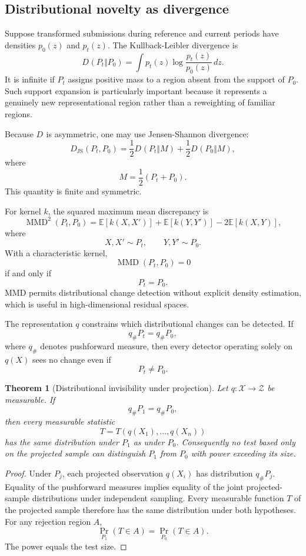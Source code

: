 \documentclass[11pt]{article}
\newtheorem{theorem}[definition]{Theorem}
\theoremstyle{definition}
\DeclareMathOperator{\KL}{D_{\mathrm{KL}}}
\DeclareMathOperator{\Prob}{Pr}
\newcommand{\E}{\mathbb{E}}
\begin{document}
\subsection{Distributional novelty as divergence}

Suppose transformed submissions during reference and current periods have densities \(p_0(z)\) and \(p_t(z)\). The Kullback-Leibler divergence is
\[
D_{\KL}(P_t\Vert P_0)
=
\int
p_t(z)
\log
\frac{p_t(z)}{p_0(z)}
\,dz.
\]
It is infinite if \(P_t\) assigns positive mass to a region absent from the support of \(P_0\). Such support expansion is particularly important because it represents a genuinely new representational region rather than a reweighting of familiar regions.

Because \(D_{\KL}\) is asymmetric, one may use Jensen-Shannon divergence:
\[
D_{\mathrm{JS}}(P_t,P_0)
=
\frac{1}{2}
D_{\KL}(P_t\Vert M)
+
\frac{1}{2}
D_{\KL}(P_0\Vert M),
\]
where
\[
M=\frac{1}{2}(P_t+P_0).
\]
This quantity is finite and symmetric.

For kernel \(k\), the squared maximum mean discrepancy is
\[
\operatorname{MMD}^2(P_t,P_0)
=
\E[k(X,X')]
+
\E[k(Y,Y')]
-
2\E[k(X,Y)],
\]
where
\[
X,X'\sim P_t,
\qquad
Y,Y'\sim P_0.
\]
With a characteristic kernel,
\[
\operatorname{MMD}(P_t,P_0)=0
\]
if and only if
\[
P_t=P_0.
\]
MMD permits distributional change detection without explicit density estimation, which is useful in high-dimensional residual spaces.

The representation \(q\) constrains which distributional changes can be detected. If
\[
q_{\#}P_t=q_{\#}P_0,
\]
where \(q_{\#}\) denotes pushforward measure, then every detector operating solely on \(q(X)\) sees no change even if
\[
P_t\neq P_0.
\]

\begin{theorem}[Distributional invisibility under projection]
Let \(q:\mathcal{X}\to\mathcal{Z}\) be measurable. If
\[
q_{\#}P_1=q_{\#}P_0,
\]
then every measurable statistic
\[
T=T(q(X_1),\ldots,q(X_n))
\]
has the same distribution under \(P_1\) as under \(P_0\). Consequently no test based only on the projected sample can distinguish \(P_1\) from \(P_0\) with power exceeding its size.
\end{theorem}

\begin{proof}
Under \(P_j\), each projected observation \(q(X_i)\) has distribution \(q_{\#}P_j\). Equality of the pushforward measures implies equality of the joint projected-sample distributions under independent sampling. Every measurable function \(T\) of the projected sample therefore has the same distribution under both hypotheses. For any rejection region \(A\),
\[
\Prob_{P_1}(T\in A)
=
\Prob_{P_0}(T\in A).
\]
The power equals the test size.
\end{proof}
\end{document}
